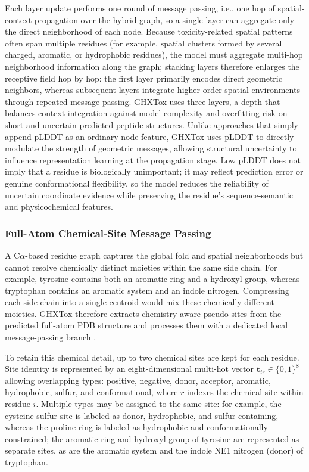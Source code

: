 \documentclass[12pt]{article}
\begin{document}
Each layer update performs one round of message passing, i.e., one hop of
spatial-context propagation over the hybrid graph, so a single layer can
aggregate only the direct neighborhood of each node. Because toxicity-related
spatial patterns often span multiple residues (for example, spatial clusters
formed by several charged, aromatic, or hydrophobic residues), the model must
aggregate multi-hop neighborhood information along the graph; stacking layers
therefore enlarges the receptive field hop by hop: the first layer primarily
encodes direct geometric neighbors, whereas subsequent layers integrate
higher-order spatial environments through repeated message passing. GHXTox
uses three layers, a depth that balances context integration against model
complexity and overfitting risk on short and uncertain predicted peptide
structures. Unlike approaches that simply append pLDDT as an ordinary node
feature, GHXTox uses pLDDT to directly modulate the strength of geometric
messages, allowing structural uncertainty to influence representation
learning at the propagation stage. Low pLDDT does not imply that a residue is
biologically unimportant; it may reflect prediction error or genuine
conformational flexibility, so the model reduces the reliability of uncertain
coordinate evidence while preserving the residue's sequence-semantic and
physicochemical features.
\subsubsection{Full-Atom Chemical-Site Message Passing}
A C$\alpha$-based residue graph captures the global fold and spatial
neighborhoods but cannot resolve chemically distinct moieties within the same
side chain. For example, tyrosine contains both an aromatic ring and a
hydroxyl group, whereas tryptophan contains an aromatic system and an indole
nitrogen. Compressing each side chain into a single centroid would mix these
chemically different moieties. GHXTox therefore extracts chemistry-aware
pseudo-sites from the predicted full-atom PDB structure and processes them
with a dedicated local message-passing branch \cite{gilmer2017mpnn}.

To retain this chemical detail, up to two chemical sites are kept for each
residue. Site identity is represented by an eight-dimensional multi-hot
vector $\mathbf t_{ir} \in \{0,1\}^{8}$ allowing overlapping types: positive,
negative, donor, acceptor, aromatic, hydrophobic, sulfur, and conformational,
where $r$ indexes the chemical site within residue $i$. Multiple types may be
assigned to the same site: for example, the cysteine sulfur site is labeled
as donor, hydrophobic, and sulfur-containing, whereas the proline ring is
labeled as hydrophobic and conformationally constrained; the aromatic ring
and hydroxyl group of tyrosine are represented as separate sites, as are the
aromatic system and the indole NE1 nitrogen (donor) of tryptophan.
\end{document}
